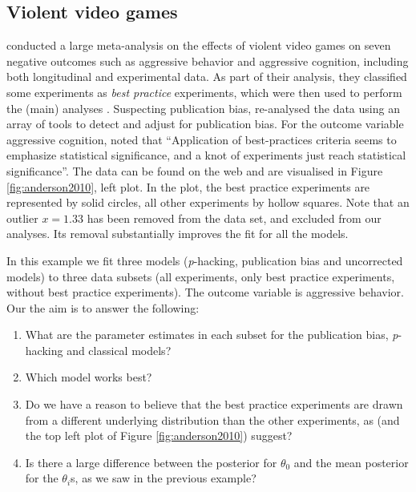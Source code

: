 \documentclass{article}
\theoremstyle{plain}
\theoremstyle{definition}
\begin{document}
\subsection{Violent video games\label{subsec:Anderson}}

\citet{anderson2010violent} conducted a large meta-analysis on the effects of violent video games on seven negative outcomes such as aggressive behavior and aggressive cognition, including both longitudinal and experimental data. As part of their analysis, they classified some experiments as \emph{best practice} experiments, which were then used to perform the (main) analyses \citep[for more details, see Table 2 of][]{anderson2010violent}. Suspecting publication bias, \citet{hilgard2017overstated} re-analysed the data using an array of tools to detect and adjust for publication bias. For the outcome variable aggressive cognition, \citet{hilgard2017overstated} noted that ``Application of best-practices criteria seems to emphasize statistical significance, and a knot of experiments just reach statistical significance''. The data can be found on the web \citep{Hilgard2017} and are visualised in Figure \ref{fig:anderson2010}, left plot. In the plot, the best practice experiments are represented by solid circles, all other experiments by hollow squares. Note that an outlier $x=1.33$ has been removed from the data set, and excluded from our analyses. Its removal substantially improves the fit for all the models. 

In this example we fit three models (\textit{p}-hacking, publication bias and uncorrected models) to three data subsets (all experiments, only best practice experiments, without best practice experiments). The outcome variable is aggressive behavior. Our the aim is to answer the following:
\begin{enumerate}
\item What are the parameter estimates in each subset for the publication bias, \textit{p}-hacking and classical models?
\item Which model works best?
\item Do we have a reason to believe that the best practice experiments are drawn from a different underlying distribution than the other experiments, as \citet{hilgard2017overstated} (and the top left plot of Figure \ref{fig:anderson2010}) suggest?
\item Is there a large difference between the posterior for $\theta_{0}$ and the mean posterior for the $\theta_{i}$s, as we saw in the previous example?
\end{enumerate}
\end{document}
